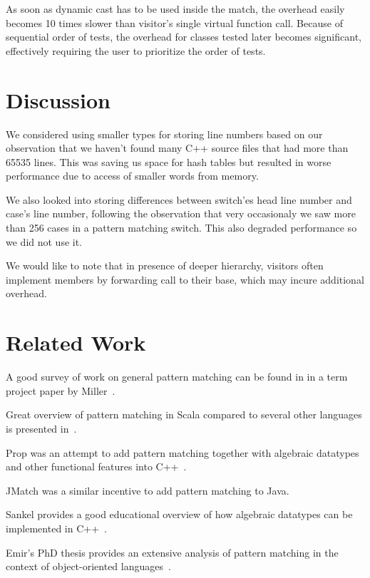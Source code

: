 \documentclass[submission,copyright]{eptcs}
\begin{document}
As soon as dynamic cast has to be used inside the match, the overhead easily 
becomes 10 times slower than visitor's single virtual function call. Because of 
sequential order of tests, the overhead for classes tested later becomes 
significant, effectively requiring the user to prioritize the order of tests.

\section{Discussion} %

We considered using smaller types for storing line numbers based on our 
observation that we haven't found many C++ source files that had more than 65535 
lines. This was saving us space for hash tables but resulted in worse 
performance due to access of smaller words from memory.

We also looked into storing differences between switch'es head line number and 
case's line number, following the observation that very occasionaly we saw more 
than 256 cases in a pattern matching switch. This also degraded performance so 
we did not use it.

We would like to note that in presence of deeper hierarchy, visitors often 
implement members by forwarding call to their base, which may incure additional 
overhead.

\section{Related Work} %
\label{sec:rw}

A good survey of work on general pattern matching can be found in in a term 
project paper by Miller~\cite{Miller10}.

Great overview of pattern matching in Scala compared to several other languages 
is presented in~\cite{ScalaPM}.

Prop was an attempt to add pattern matching together with algebraic datatypes 
and other functional features into C++~\cite{Prop96}.

JMatch was a similar incentive to add pattern matching to Java.

Sankel provides a good educational overview of how algebraic datatypes can be 
implemented in C++~\cite{SankelFP10,Sankel10}. 

Emir's PhD thesis provides an extensive analysis of pattern matching in the 
context of object-oriented languages~\cite{EmirThesis}.
\end{document}

